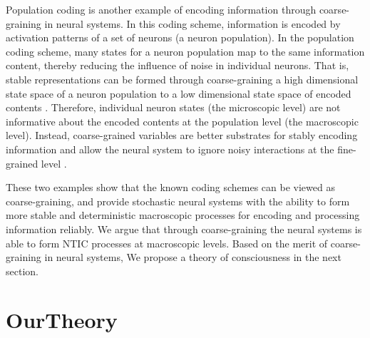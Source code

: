 \documentclass[utf8]{article}
\begin{document}
		Population coding is another example of encoding information through coarse-graining in neural systems. In this coding scheme, information is encoded by activation patterns of a set of neurons (a neuron population). In the population coding scheme, many states for a neuron population map to the same information content, thereby reducing the influence of noise in individual neurons. That is, stable representations can be formed through coarse-graining a high dimensional state space of a neuron population to a low dimensional state space of encoded contents \citep{kristan1997population, pouget2000information, binder2009encyclopedia, QuianQuiroga2009}. Therefore, individual neuron states (the microscopic level) are not informative about the encoded contents at the population level (the macroscopic level). Instead, coarse-grained variables are better substrates for stably encoding information and allow the neural system to ignore noisy interactions at the fine-grained level \citep{Woodward2007-WOOCWA}.
		
        These two examples show that the known coding schemes can be viewed as coarse-graining, and provide stochastic neural systems with the ability to form more stable and deterministic macroscopic processes for encoding and processing information reliably. We argue that through coarse-graining the neural systems is able to form NTIC processes at macroscopic levels. Based on the merit of coarse-graining in neural systems, We propose a theory of consciousness in the next section. 


			
			




	\section{\acf{OurTheory}}\label{sec:OurTheory}
	
\end{document}
